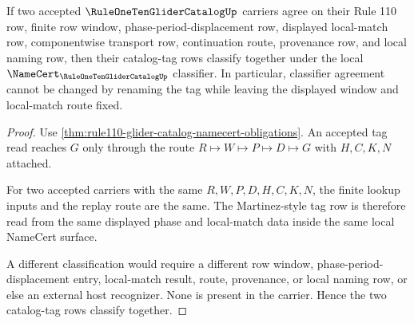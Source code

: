 \begin{theorem}
\label{thm:rule110-glider-catalog-classifier-stability}
If two accepted $\RuleOneTenGliderCatalogUp$ carriers agree on their Rule 110 row, finite row window, phase-period-displacement row, displayed local-match row, componentwise transport row, continuation route, provenance row, and local naming row, then their catalog-tag rows classify together under the local $\NameCert_{\RuleOneTenGliderCatalogUp}$ classifier. In particular, classifier agreement cannot be changed by renaming the tag while leaving the displayed window and local-match route fixed.
\end{theorem}
\begin{proof}
Use \autoref{thm:rule110-glider-catalog-namecert-obligations}. An accepted tag read reaches $G$ only through the route $R \longmapsto W \longmapsto P \longmapsto D \longmapsto G$ with $H,C,K,N$ attached.

For two accepted carriers with the same $R,W,P,D,H,C,K,N$, the finite lookup inputs and the replay route are the same. The Martinez-style tag row is therefore read from the same displayed phase and local-match data inside the same local NameCert surface.

A different classification would require a different row window, phase-period-displacement entry, local-match result, route, provenance, or local naming row, or else an external host recognizer. None is present in the carrier. Hence the two catalog-tag rows classify together.
\end{proof}

